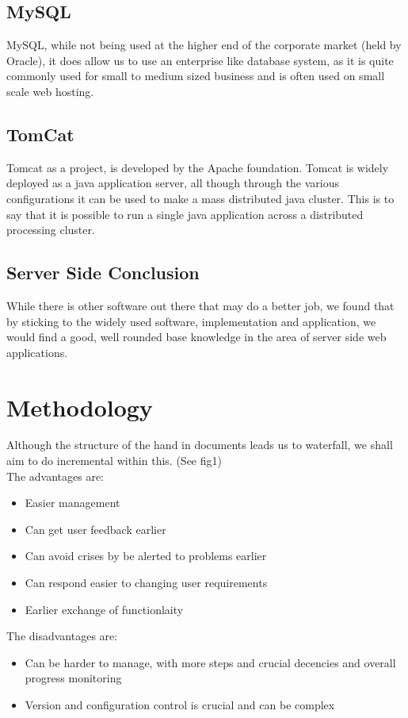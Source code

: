 \documentclass{project}
\begin{document}
\subsection{MySQL}
MySQL, while not being used at the higher end of the corporate market (held by
Oracle), it does allow us to use an enterprise like database system, as it is quite
commonly used for small to medium sized business and is often used on small scale
web hosting.
\subsection{TomCat}
Tomcat as a project, is developed by the Apache foundation. Tomcat is widely
deployed as a java application server, all though through the various configurations
it can be used to make a mass distributed java cluster. This is to say that it is
possible to run a single java application across a distributed processing cluster.
\subsection{Server Side Conclusion}
While there is other software out there that may do a better job, we found that by
sticking to the widely used software, implementation and application, we would find
a good, well rounded base knowledge in the area of server side web applications.
\section{Methodology}
Although the structure of the hand in documents leads us to waterfall, we shall aim
to do incremental within this. (See fig1)
\\
The advantages are:
\begin{itemize}
	\item Easier management
	\item Can get user feedback earlier
	\item Can avoid crises by be alerted to problems earlier
	\item Can respond easier to changing user requirements
	\item Earlier exchange of functionlaity
\end{itemize}

The disadvantages are:
\begin{itemize}
	\item Can be harder to manage, with more steps and crucial decencies and overall
progress monitoring
	\item Version and configuration control is crucial and can be complex
\end{itemize}
\end{document}
